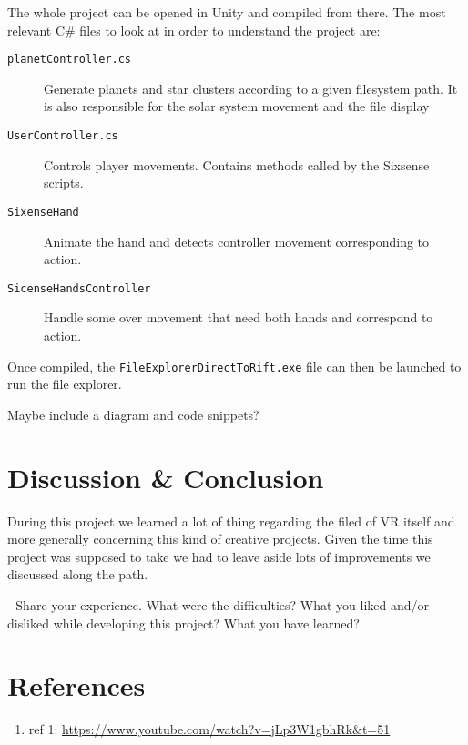 \documentclass[paper=a4, fontsize=11pt]{scrartcl} %
\numberwithin{equation}{section} %
\numberwithin{figure}{section} %
\numberwithin{table}{section} %
\begin{document}
	
	The whole project can be opened in Unity and compiled from there. The most relevant C\# files to look at in order to understand the project are:
	\begin{description}
		\item[\texttt{planetController.cs}] Generate planets and star clusters according to a given filesystem path. It is also responsible for the solar system movement and the file display 
		\item[\texttt{UserController.cs}] Controls player movements. Contains methods called by the Sixsense scripts.
		\item[\texttt{SixenseHand}] Animate the hand and detects controller movement corresponding to action.
		\item[\texttt{SicenseHandsController}] Handle some over movement that need both hands and correspond to action.
	\end{description}
	
	Once compiled, the \texttt{FileExplorerDirectToRift.exe} file can then be launched to run the file explorer.
	
	Maybe include a diagram and code snippets?
	
	
	\section{Discussion \& Conclusion}
	
	During this project we learned a lot of thing regarding the filed of VR itself and more generally concerning this kind of creative projects. Given the time this project was supposed to take we had to leave aside lots of improvements we discussed along the path. 
	
	- Share your experience. What were the difficulties? What you liked and/or disliked while developing this project? What you have learned?
	
	
	\section{References}
	\label{sec:refs}
	\begin{enumerate}
		\item ref 1: \url{https://www.youtube.com/watch?v=jLp3W1gbhRk&t=51}
	\end{enumerate}
	
	
\end{document}
